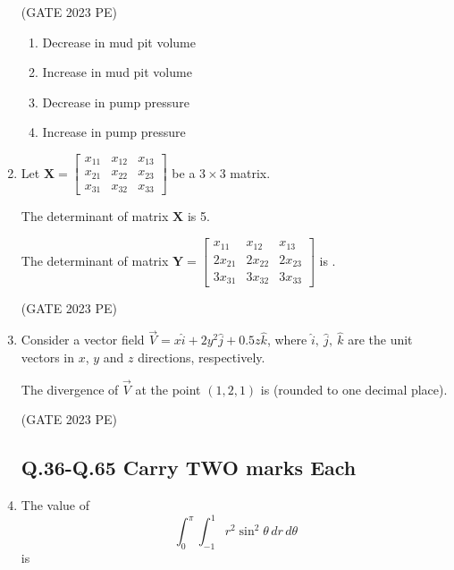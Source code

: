 \documentclass[journal,12pt,onecolumn]{exam}
\theoremstyle{remark}
\begin{document}
\begin{enumerate}
\hfill{(GATE 2023 PE)}\\
\begin{enumerate}
    \item Decrease in mud pit volume
    \item Increase in mud pit volume
    \item Decrease in pump pressure
    \item Increase in pump pressure
\end{enumerate}
\item 
Let $\mathbf{X} = 
\begin{bmatrix}
x_{11} & x_{12} & x_{13} \\
x_{21} & x_{22} & x_{23} \\
x_{31} & x_{32} & x_{33}
\end{bmatrix}
$ be a $3 \times 3$ matrix.

The determinant of matrix $\mathbf{X}$ is 5.

The determinant of matrix $\mathbf{Y} = 
\begin{bmatrix}
x_{11} & x_{12} & x_{13} \\
2x_{21} & 2x_{22} & 2x_{23} \\
3x_{31} & 3x_{32} & 3x_{33}
\end{bmatrix}
$ is \underline{\hspace{2cm}}.

\hfill{(GATE 2023 PE)}\\
\item 
Consider a vector field $\vec{V} = x\hat{i} + 2y^2\hat{j} + 0.5z\hat{k}$, where $\hat{i},\ \hat{j},\ \hat{k}$ are the unit vectors in $x$, $y$ and $z$ directions, respectively.

The divergence of $\vec{V}$ at the point $(1, 2, 1)$ is \underline{\hspace{2cm}} (rounded to one decimal place).

\hfill{(GATE 2023 PE)}\\
\subsection*{Q.36-Q.65 Carry TWO marks Each}
\item  The value of 
\[
\int_{0}^{\pi} \int_{-1}^{1} r^{2} \sin^{2}\theta \, dr \, d\theta
\]
is


\end{enumerate}
\end{document}
